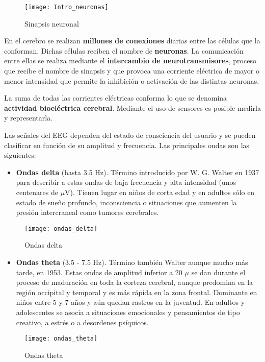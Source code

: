 \begin{wrapfigure}[14]{R}{8cm}
    \centering
    \texttt{[image: Intro\_neuronas]}
    \caption{Sinapsis neuronal \cite{wikipedia}}
    \label{fig:Intro_neuronas}

\end{wrapfigure}
En el cerebro se realizan \textbf{millones de conexiones} diarias entre las células que la conforman. Dichas células reciben el nombre de \textbf{neuronas}. La comunicación entre ellas se realiza mediante el \textbf{intercambio de neurotransmisores}, proceso que recibe el nombre de sinapsis y que provoca una corriente eléctrica de mayor o menor intensidad que permite la inhibición o activación de las distintas neuronas. 

La suma de todas las corrientes eléctricas conforma lo que se denomina \textbf{actividad bioeléctrica cerebral}. Mediante el uso de sensores es posible medirla y representarla.

Las señales del \acrshort{EEG} dependen del estado de consciencia del usuario y se pueden clasificar en función de su amplitud y frecuencia. Las principales ondas son las siguientes:

\begin{itemize}
\item\textbf{Ondas delta} (hasta 3.5 Hz). Término introducido por W. G. Walter en 1937 para describir a estas ondas de baja frecuencia y alta intensidad (unos centenares de $\mu$V). Tienen lugar en niños de corta edad y en adultos sólo en estado de sueño profundo, inconsciencia o situaciones que aumenten la presión intercraneal como tumores cerebrales.
\end{itemize}
\begin{figure} [H]
    \centering
    \texttt{[image: ondas\_delta]}
    \caption{Ondas delta \cite{apuntes}}
    \label{fig:ondas_delta}
\end{figure}

\clearpage

\begin{itemize}
\item\textbf{Ondas theta} (3.5 - 7.5 Hz). Término también Walter aunque mucho más tarde, en 1953. Estas ondas de amplitud inferior a 20 $\mu$ se dan durante el proceso de maduración en toda la corteza cerebral, aunque predomina en la región occipital y temporal y es más rápida en la zona frontal. Dominante en niños entre 5 y 7 años y aún quedan rastros en la juventud. En adultos y adolescentes se asocia a situaciones emocionales y pensamientos de tipo creativo, a estrés o a desordenes psíquicos.
\end{itemize}
\begin{figure} [H]
    \centering
    \texttt{[image: ondas\_theta]}
    \caption{Ondas theta \cite{apuntes}}
    \label{fig:ondas_theta}
\end{figure}

